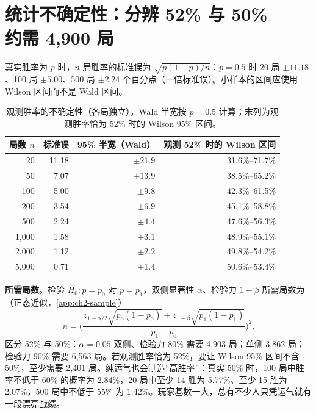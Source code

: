 \section[统计不确定性：分辨 52\% 与 50\% 约需 4,900 局]{统计不确定性：分辨 52\% 与 50\%\\约需 4,900 局}
\label{sec:ch2-stats}

真实胜率为 $p$ 时，$n$ 局胜率的标准误为 $\sqrt{p(1-p)/n}$：$p=0.5$ 时 20 局 $\pm11.18$、100 局 $\pm5.00$、500 局 $\pm2.24$ 个百分点（一倍标准误）\tagOwn。小样本的区间应使用 Wilson 区间而不是 Wald 区间\cite{wilson1927probable,brown2001interval}\tagLit{}。

\begin{table}[htbp]
  \centering\small
  \caption{观测胜率的不确定性（各局独立）。Wald 半宽按 $p=0.5$ 计算；末列为观测胜率恰为 52\% 时的 Wilson 95\% 区间。\tagOwn}
  \label{tab:ch2-ci}
  \begin{tabular}{rrrr}
    \toprule
    局数 $n$ & 标准误 & 95\% 半宽（Wald） & 观测 52\% 时的 Wilson 区间\\
    \midrule
    20 & 11.18 & $\pm21.9$ & 31.6\%–71.7\%\\
    50 & 7.07 & $\pm13.9$ & 38.5\%–65.2\%\\
    100 & 5.00 & $\pm9.8$ & 42.3\%–61.5\%\\
    200 & 3.54 & $\pm6.9$ & 45.1\%–58.8\%\\
    500 & 2.24 & $\pm4.4$ & 47.6\%–56.3\%\\
    1,000 & 1.58 & $\pm3.1$ & 48.9\%–55.1\%\\
    2,000 & 1.12 & $\pm2.2$ & 49.8\%–54.2\%\\
    5,000 & 0.71 & $\pm1.4$ & 50.6\%–53.4\%\\
    \bottomrule
  \end{tabular}
\end{table}

\textbf{所需局数}。检验 $H_0\colon p=p_0$ 对 $p=p_1$，双侧显著性 $\alpha$、检验力 $1-\beta$ 所需局数为（正态近似，\cref{app:ch2-sample}）
\begin{equation}
  n=\Biggl(\frac{z_{1-\alpha/2}\sqrt{p_0(1-p_0)}+z_{1-\beta}\sqrt{p_1(1-p_1)}}{p_1-p_0}\Biggr)^2.
  \label{eq:ch2-samplesize}
\end{equation}
区分 52\% 与 50\%：$\alpha=0.05$ 双侧、检验力 80\% 需要 4,903 局；单侧 3,862 局；检验力 90\% 需要 6,563 局。若观测胜率恰为 52\%，要让 Wilson 95\% 区间不含 50\%，至少需要 2,401 局\tagOwn。纯运气也会制造“高胜率”：真实 50\% 时，100 局中胜率不低于 60\% 的概率为 2.84\%，20 局中至少 14 胜为 5.77\%、至少 15 胜为 2.07\%，500 局中不低于 55\% 为 1.42\%\tagOwn。玩家基数一大，总有不少人只凭运气就有一段漂亮战绩。

